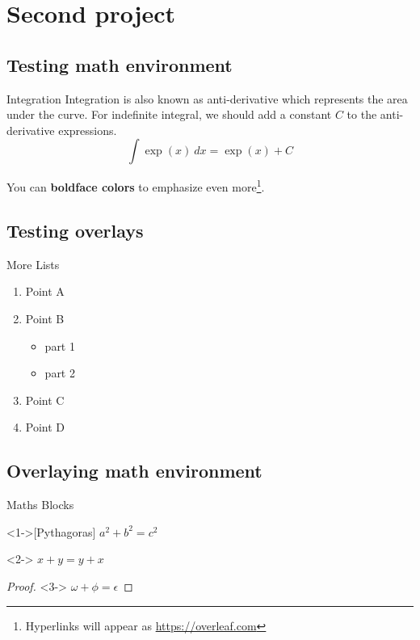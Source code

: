 \documentclass[xcolor=dvipsnames,aspectratio=169]{beamer}
\newcommand{\BLUE}{\textcolor{JHUDeepBlue}}
\begin{document}
\section{Second project}
\subsection{Testing math environment}
\begin{frame}{Integration}
    Integration is also known as anti-derivative which represents the area under the curve. For indefinite integral, we should add a constant $C$ to the anti-derivative expressions.
    \begin{equation*}
        \int \exp(x) \ dx = \exp(x) + C
    \end{equation*}
    
    You can \textbf{\BLUE{boldface colors}} to emphasize even more\footnote{Hyperlinks will appear as \url{https://overleaf.com}}.
   
\end{frame}


\subsection{Testing overlays}
\begin{frame}{More Lists}
    \begin{enumerate}[I]
    \item<1-> Point A\footnotemark
    \item<2-> Point B
    \begin{itemize}
    \item<3-> part 1
    \item<4-> part 2
    \end{itemize}
    \item<5-> Point C
    \item<6-> Point D
    \end{enumerate}
    
\end{frame}
\subsection{Overlaying math environment}
\begin{frame}{Maths Blocks}
    \begin{theorem}<1->[Pythagoras] 
        $ a^2 + b^2 = c^2$
    \end{theorem}
    \begin{corollary}<2->
        $ x + y = y + x  $
    \end{corollary}
    \begin{proof}<3->
        $\omega +\phi = \epsilon $
    \end{proof}
\end{frame}
\end{document}
